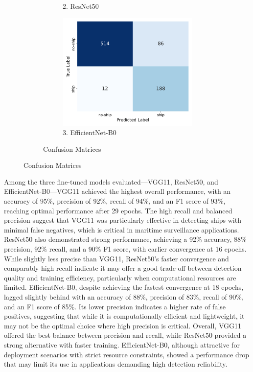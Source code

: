 \documentclass[11pt]{article}
\begin{document}
\begin{figure}[H]
\begin{subfigure}[b]{\textwidth}
\begin{subfigure}[b]{0.32\textwidth}
				\caption*{2. ResNet50}
			\end{subfigure}
			\hfill
			\begin{subfigure}[b]{0.32\textwidth}
				\centering
				\captionsetup{labelformat=empty}
				\includegraphics[width=\textwidth]{assets/confusion_matrix/efficientnet_confusion_matrix.png}
				\caption*{3. EfficientNet-B0}
			\end{subfigure}
			\caption{Confusion Matrices}
		\end{subfigure}
		
	\end{figure}
	
	Among the three fine-tuned models evaluated—VGG11, ResNet50, and EfficientNet-B0—VGG11 achieved the highest overall performance, with an accuracy of 95\%, precision of 92\%, recall of 94\%, and an F1 score of 93\%, reaching optimal performance after 29 epochs. The high recall and balanced precision suggest that VGG11 was particularly effective in detecting ships with minimal false negatives, which is critical in maritime surveillance applications. ResNet50 also demonstrated strong performance, achieving a 92\% accuracy, 88\% precision, 92\% recall, and a 90\% F1 score, with earlier convergence at 16 epochs. While slightly less precise than VGG11, ResNet50's faster convergence and comparably high recall indicate it may offer a good trade-off between detection quality and training efficiency, particularly when computational resources are limited. EfficientNet-B0, despite achieving the fastest convergence at 18 epochs, lagged slightly behind with an accuracy of 88\%, precision of 83\%, recall of 90\%, and an F1 score of 85\%. Its lower precision indicates a higher rate of false positives, suggesting that while it is computationally efficient and lightweight, it may not be the optimal choice where high precision is critical. Overall, VGG11 offered the best balance between precision and recall, while ResNet50 provided a strong alternative with faster training. EfficientNet-B0, although attractive for deployment scenarios with strict resource constraints, showed a performance drop that may limit its use in applications demanding high detection reliability.
	
\end{document}
